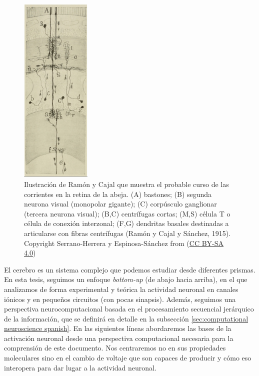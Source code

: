 \begin{figure}[htb!]
    \centering
    \includegraphics[width=0.3\textwidth]{img/intro/cajal-flow_small.jpg}
    \caption{Ilustración de Ramón y Cajal que muestra el probable curso de las corrientes en la retina de la abeja. (A) bastones; (B) segunda neurona visual (monopolar gigante); (C) corpúsculo ganglionar (tercera neurona visual); (B,C) centrífugas cortas; (M,S) célula T o célula de conexión interzonal; (F,G) dendritas basales destinadas a articularse con fibras centrífugas (Ramón y Cajal y Sánchez, 1915). Copyright Serrano-Herrera y Espinosa-Sánchez from \textcite{serrano-herrera_domingo_2024} (\href{https://creativecommons.org/licenses/by-sa/4.0/}{CC BY-SA 4.0})}
    \label{fig:cajal-neuron spanish}
\end{figure}

El cerebro es un sistema complejo que podemos estudiar desde diferentes prismas. En esta tesis, seguimos un enfoque \textit{bottom-up} (de abajo hacia arriba), en el que analizamos de forma experimental y teórica la actividad neuronal en canales iónicos y en pequeños circuitos (con pocas sinapsis). Además, seguimos una perspectiva neurocomputacional basada en el procesamiento secuencial jerárquico de la información, que se definirá en detalle en la subsección \ref{sec:computational neuroscience spanish}. En las siguientes líneas abordaremos las bases de la activación neuronal desde una perspectiva computacional necesaria para la comprensión de este documento. Nos centraremos no en sus propiedades moleculares sino en el cambio de voltaje que son capaces de producir y cómo eso interopera para dar lugar a la actividad neuronal.


